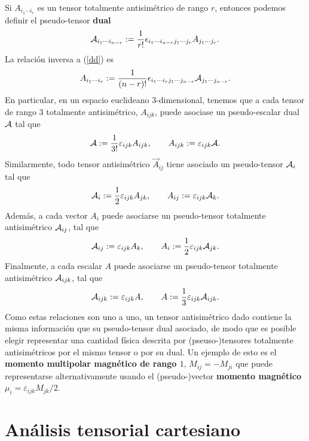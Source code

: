 Si $A_{i_1\cdots i_r}$ es un tensor totalmente antisimétrico de rango $r$, entonces podemos definir el pseudo-tensor \textbf{dual}
\begin{equation}\label{dd}
{\cal A}_{i_1\cdots i_{n-r}}:=\frac{1}{r!}\epsilon_{i_1\cdots i_{n-r}j_1\cdots j_r}A_{j_1\cdots j_r}.
\end{equation}
La relación inversa a (\ref{dd}) es
\begin{equation}\label{id}
A_{i_1\cdots i_r}:=\frac{1}{(n-r)!}\epsilon_{i_1\cdots i_rj_1\cdots j_{n-r}}{\cal A}_{j_1\cdots j_{n-r}}.
\end{equation}
En particular, en un espacio euclideano 3-dimensional, tenemos que a cada tensor de rango 3 totalmente antisimétrico, $A_{ijk}$, puede asociase un pseudo-escalar dual ${\cal A}$ tal que
\begin{equation}
{\cal A}:=\frac{1}{3!}\varepsilon_{ijk}A_{ijk}, \qquad A_{ijk}:=\varepsilon_{ijk}{\cal A}.
\end{equation}
Similarmente, todo tensor antisimétrico $\vec{A}_{ij}$ tiene asociado un pseudo-tensor ${\cal A}_i$ tal que
\begin{equation}
{\cal A}_i:=\frac{1}{2}\varepsilon_{ijk}A_{jk}, \qquad A_{ij}:=\varepsilon_{ijk}{\cal A}_k.
\end{equation}
Además, a cada vector $A_i$ puede asociarse un pseudo-tensor totalmente antisimétrico ${\cal A}_{ij}$, tal que
\begin{equation}
{\cal A}_{ij}:=\varepsilon_{ijk}A_{k}, \qquad A_i:=\frac{1}{2}\varepsilon_{ijk}{\cal A}_{jk}.
\end{equation}
Finalmente, a cada escalar $A$ puede asociarse un pseudo-tensor totalmente antisimétrico ${\cal A}_{ijk}$, tal que
\begin{equation}
{\cal A}_{ijk}:=\varepsilon_{ijk}A, \qquad A:=\frac{1}{3}\varepsilon_{ijk}{\cal A}_{ijk}.
\end{equation}
Como estas relaciones son uno a uno, un tensor antisimétrico dado contiene la misma información que su pseudo-tensor dual asociado, de modo que es posible elegir representar una cantidad física descrita por (pseuso-)tensores totalmente antisimétricos por el mismo tensor o por su dual. Un ejemplo de esto es el \textbf{momento multipolar magnético de rango $1$}, $M_{ij}=-M_{ji}$ que puede representarse alternativamente usando el (pseudo-)vector \textbf{momento magnético} $\mu_i=\varepsilon_{ijk}M_{jk}/2$.

\section{Análisis tensorial cartesiano}
